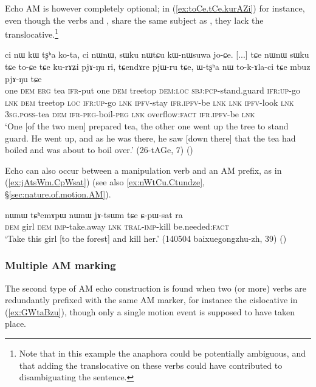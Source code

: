 Echo AM is however completely optional; in (\ref{ex:toCe.tCe.kurAZi}) for instance, even though the verbs  and , share the same subject as , they lack the translocative.\footnote{Note that in this example the anaphora could be potentially ambiguous, and that adding the translocative on these verbs could have contributed to disambiguating the sentence. }

\begin{exe}
\ex \label{ex:toCe.tCe.kurAZi}
\gll ci nɯ kɯ tʂʰa ko-ta, ci nɯnɯ, sɯku nɯtɕu kɯ-nɯsuwa jo-ɕe. [...] tɕe nɯnɯ sɯku tɕe to-ɕe tɕe ku-rɤʑi pjɤ-ŋu ri,
tɕendɤre pjɯ-ru tɕe, ɯ-tʂʰa nɯ to-k-ɤla-ci tɕe mbuz pjɤ-ŋu tɕe  \\
one \textsc{dem} \textsc{erg} tea \textsc{ifr}-put one \textsc{dem} treetop \textsc{dem}:\textsc{loc} \textsc{sbj}:\textsc{pcp}-stand.guard \textsc{ifr}:\textsc{up}-go { } \textsc{lnk} \textsc{dem} treetop \textsc{loc} \textsc{ifr}:\textsc{up}-go \textsc{lnk} \textsc{ipfv}-stay \textsc{ifr}.\textsc{ipfv}-be \textsc{lnk} \textsc{lnk} \textsc{ipfv}-look \textsc{lnk} \textsc{3sg}.\textsc{poss}-tea \textsc{dem} \textsc{ifr}-\textsc{peg}-boil-\textsc{peg} \textsc{lnk} overflow:\textsc{fact} \textsc{ifr}.\textsc{ipfv}-be \textsc{lnk} \\
\glt `One [of the two men] prepared tea, the other one went up the tree to stand guard. He went up, and as he was there, he saw [down there] that the tea had boiled and was about to boil over.' (26-tAGe, 7) 	()
\end{exe}

Echo can also occur between a manipulation verb and an AM prefix, as in (\ref{ex:jAtsWm.CpWsat}) (see also  \ref{ex:nWtCu.Ctundze},  §\ref{sec:nature.of.motion.AM}).

\begin{exe}
	\ex \label{ex:jAtsWm.CpWsat}
	\gll nɯnɯ tɕʰemɤpɯ nɯnɯ jɤ-tsɯm tɕe ɕ-pɯ-sat ra \\
	\textsc{dem} girl \textsc{dem} \textsc{imp}-take.away \textsc{lnk} \textsc{tral}-\textsc{imp}-kill be.needed:\textsc{fact} \\
	\glt `Take this girl [to the forest] and kill her.' (140504 baixuegongzhu-zh, 39) 	()
\end{exe}


\subsubsection{Multiple AM marking} \label{sec:echo.multiple.AM}
The second type of AM echo construction is found when two (or more) verbs are redundantly prefixed with the same AM marker, for instance the cislocative  in (\ref{ex:GWtaBzu}), though only a single motion event is supposed to have taken place.

